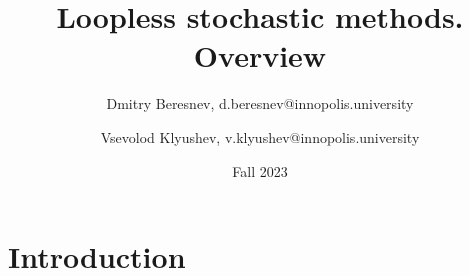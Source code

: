 \documentclass{article}
\title{Loopless stochastic methods. Overview}
\date{Fall 2023}
\author{
  Dmitry Beresnev, d.beresnev@innopolis.university
  \and
  Vsevolod Klyushev, v.klyushev@innopolis.university
}
\begin{document}
\maketitle
\section{Introduction}
\end{document}
